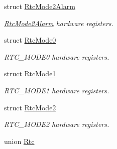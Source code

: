 \begin{DoxyCompactItemize}
struct \mbox{\hyperlink{struct_rtc_mode2_alarm}{Rtc\+Mode2\+Alarm}}
\begin{DoxyCompactList}\small\item\em \mbox{\hyperlink{struct_rtc_mode2_alarm}{Rtc\+Mode2\+Alarm}} hardware registers. \end{DoxyCompactList}\item 
struct \mbox{\hyperlink{struct_rtc_mode0}{Rtc\+Mode0}}
\begin{DoxyCompactList}\small\item\em R\+T\+C\+\_\+\+M\+O\+D\+E0 hardware registers. \end{DoxyCompactList}\item 
struct \mbox{\hyperlink{struct_rtc_mode1}{Rtc\+Mode1}}
\begin{DoxyCompactList}\small\item\em R\+T\+C\+\_\+\+M\+O\+D\+E1 hardware registers. \end{DoxyCompactList}\item 
struct \mbox{\hyperlink{struct_rtc_mode2}{Rtc\+Mode2}}
\begin{DoxyCompactList}\small\item\em R\+T\+C\+\_\+\+M\+O\+D\+E2 hardware registers. \end{DoxyCompactList}\item 
union \mbox{\hyperlink{union_rtc}{Rtc}}
\end{DoxyCompactItemize}
